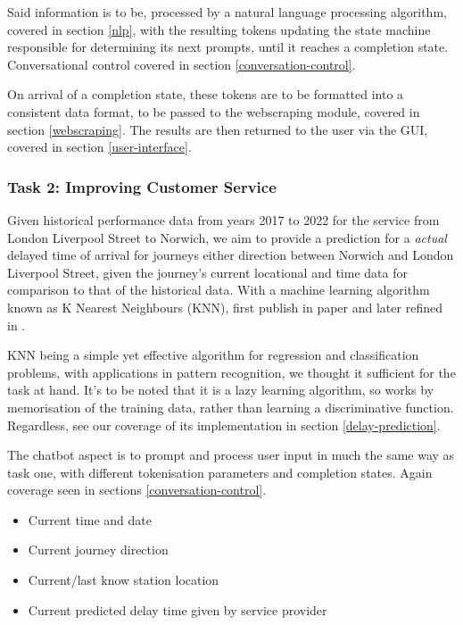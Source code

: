 \documentclass[11pt]{article}
\newcounter{subsubsubsection}[subsubsection]
\begin{document}
Said information is to be, processed by a natural language processing algorithm, covered in section \ref{nlp}, with the resulting tokens updating the state machine responsible for determining its next prompts, until it reaches a completion state. Conversational control covered in section \ref{conversation-control}.

On arrival of a completion state, these tokens are to be formatted into a consistent data format, to be passed to the webscraping module, covered in section \ref{webscraping}. The results are then returned to the user via the GUI, covered in section \ref{user-interface}.


\subsubsection{Task 2: Improving Customer Service} \label{task2-aims-objectives}

Given historical performance data from years 2017 to 2022 for the service from London Liverpool Street to Norwich, we aim to provide a prediction for a \textit{actual} delayed time of arrival for journeys either direction between Norwich and London Liverpool Street, given the journey's current locational and time data for comparison to that of the historical data. With a machine learning algorithm known as K Nearest Neighbours (KNN), first publish in paper \cite{knn-origin} and later refined in \cite{knn-refine}.

KNN being a simple yet effective algorithm for regression and classification problems, with applications in pattern recognition, we thought it sufficient for the task at hand. It's to be noted that it is a lazy learning algorithm, so works by memorisation of the training data, rather than learning a discriminative function. Regardless, see our coverage of its implementation in section \ref{delay-prediction}.

The chatbot aspect is to prompt and process user input in much the same way as task one, with different tokenisation parameters and completion states. Again coverage seen in sections \ref{conversation-control}.

\begin{itemize}
    \item Current time and date
    \item Current journey direction
    \item Current/last know station location
    \item Current predicted delay time given by service provider
\end{itemize}
\end{document}
